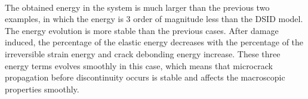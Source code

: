 \documentclass[preprint,review,12pt]{elsarticle}
\begin{document}
\
\\
The obtained energy in the system is much larger than the previous two examples, in which the energy is 3 order of magnitude less than the DSID model. The energy evolution is more stable than the previous cases. After damage induced, the percentage of the elastic energy decreases with the percentage of the irreversible strain energy and crack debonding energy increase. These three energy terms evolves smoothly in this case, which means that microcrack propagation before discontinuity occurs is stable and affects the macroscopic properties smoothly.
\
\\
\begin{figure}[htbp]
\end{figure}
\end{document}
